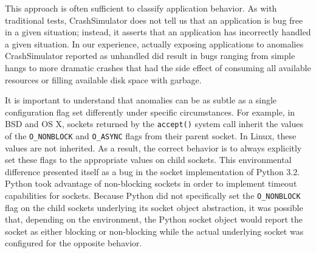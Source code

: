 This approach is often sufficient to classify application behavior.  As
with traditional tests, CrashSimulator does not tell us that an application
is bug free in a given situation; instead, it asserts that an application
has incorrectly handled a given situation.  In our experience, actually
exposing applications to anomalies CrashSimulator reported as unhandled
did result
in bugs ranging from simple hangs to more dramatic crashes that
had the side effect of consuming all available resources or filling
available disk space with garbage.

It is important to understand that anomalies can
be as subtle as a single configuration flag set differently under
specific circumstances.  For example, in BSD and OS X, sockets returned by
the {\tt accept()} system call inherit the values of the {\tt O\_NONBLOCK}
and {\tt O\_ASYNC} flags from their parent socket.  In Linux, these values
are not inherited.  As a result, the correct behavior is to always
explicitly set these flags to the appropriate values on child sockets.
This environmental difference presented itself as a bug in the socket
implementation of Python 3.2.  Python took advantage of non-blocking
sockets in order to implement timeout capabilities for sockets.  Because
Python did not specifically set the {\tt O\_NONBLOCK} flag on the child
sockets underlying its socket object abstraction, it was possible that,
depending on the environment, the Python socket object would report the
socket as either blocking or non-blocking while the actual underlying
socket was configured for the opposite behavior.
